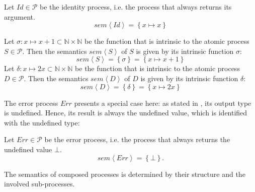 \begin{definition}
\label{def:sem_id}
Let $Id \in \mathcal{P}$ be the identity process, i.e. the process that always returns its argument.
\begin{equation}
  \label{eqn:sem_id}
  sem \left\langle Id \right\rangle = \left\{ x \mapsto x \right\}
\end{equation}
\hfill\qedsymbol
\end{definition}


\begin{example}
  \label{exp:sem_atomic}
  Let $\sigma \colon x \mapsto x+1 \subset \mathbb{N} \times \mathbb{N}$ be the function that is intrinsic to the atomic process $S \in \mathcal{P}$. Then the semantics $sem \left\langle S \right\rangle$ of $S$ is given by its intrinsic function $\sigma$:
  \begin{equation}
    sem \left\langle S \right\rangle = \left\{ \sigma \right\} = \left\{ x \mapsto x+1 \right\}
  \end{equation}
  Let $\delta \colon x \mapsto 2x \subset \mathbb{N} \times \mathbb{N}$ be the function that is intrinsic to the atomic process $D \in \mathcal{P}$. Then the semantics $sem \left\langle D \right\rangle$ of $D$ is given by its intrinsic function $\delta$:
  \begin{equation}
    sem \left\langle D \right\rangle = \left\{ \delta \right\} = \left\{ x \mapsto 2x \right\}
  \end{equation}
  \hfill\qedsymbol
\end{example}

The error process $Err$ presents a special case here: as stated in , its output type is undefined. Hence, its result is always the undefined value, which is identified with the undefined type:
\begin{definition}
\label{def:sem_err}
Let $Err \in \mathcal{P}$ be the error process, i.e. the process that always returns the undefined value $\bot$.
  \begin{equation}
    \label{eqn:sem_error}
    sem \left\langle Err \right\rangle = \left\{ \bot \right\}.
  \end{equation}
  \hfill\qedsymbol
\end{definition}

The semantics of composed processes is determined by their structure and the involved sub-processes. 

